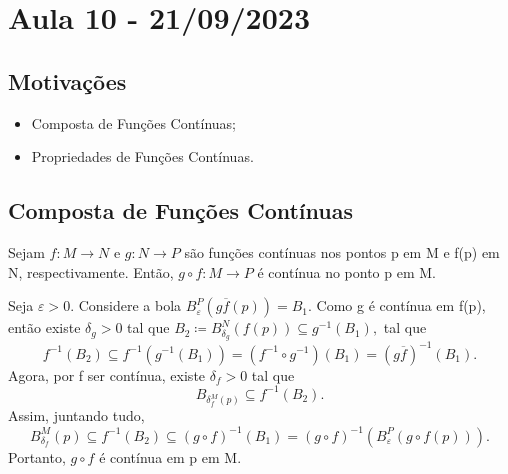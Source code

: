 \documentclass[metric_notes.tex]{subfiles}
\begin{document}
\section{Aula 10 - 21/09/2023}
\subsection{Motivações}
\begin{itemize}
	\item Composta de Funções Contínuas;
	\item Propriedades de Funções Contínuas.
\end{itemize}
\subsection{Composta de Funções Contínuas}
\begin{prop*}
	Sejam \(f:M\rightarrow N\) e \(g:N\rightarrow P\) são funções contínuas nos pontos p em M e f(p) em N,
	respectivamente. Então, \(g\circ{f}:M\rightarrow P\) é contínua no ponto p em M.
\end{prop*}
\begin{proof*}
	Seja \(\varepsilon >0.\) Considere a bola \(B_{\varepsilon }^{P}(g\overline{f}(p)) = B_{1}.\) Como g é contínua em f(p), então
	existe \(\delta_{g}>0\) tal que \(B_{2}\coloneqq B_{\delta_{g}}^{N}(f(p))\subseteq{g^{-1}(B_{1}),}\) tal que
	\[
		f^{-1}(B_{2})\subseteq{f^{-1}(g^{-1}(B_{1}))} = (f^{-1}\circ{g^{-1}})(B_{1}) = (g\overline{f})^{-1}(B_{1}).
	\]
	Agora, por f ser contínua, existe \(\delta_{f}>0\) tal que
	\[
		B_{\delta_{f}^{M}(p)}\subseteq{f^{-1}(B_{2})}.
	\]
	Assim, juntando tudo,
	\[
		B_{\delta_{f}}^{M}(p)\subseteq{f^{-1}(B_{2})}\subseteq{(g\circ{f})^{-1}(B_{1})} = (g\circ{f})^{-1}(B_{\varepsilon }^{P}(g\circ{f}(p))).
	\]
	Portanto, \(g\circ{f}\) é contínua em p em M. \qedsymbol
\end{proof*}
\end{document}
